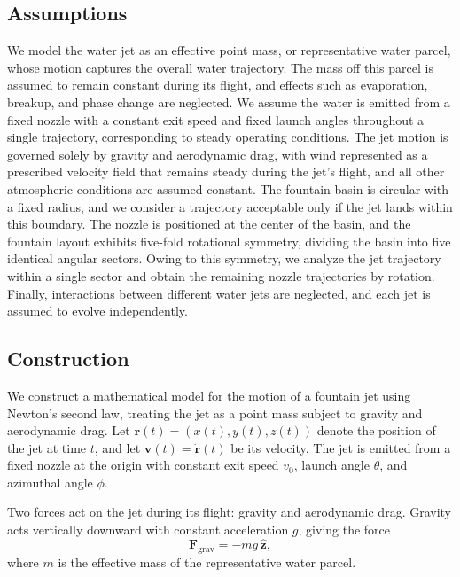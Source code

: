 \documentclass{article}
\begin{document}
\subsection{Assumptions}

We model the water jet as an effective point mass, or representative water parcel, whose motion captures the overall water trajectory. The mass off this parcel is assumed to remain constant during its flight, and effects such as evaporation, breakup, and phase change are neglected. We assume the water is emitted from a fixed nozzle with a constant exit speed and fixed launch angles throughout a single trajectory, corresponding to steady operating conditions. The jet motion is governed solely by gravity and aerodynamic drag, with wind represented as a prescribed velocity field that remains steady during the jet’s flight, and all other atmospheric conditions are assumed constant. The fountain basin is circular with a fixed radius, and we consider a trajectory acceptable only if the jet lands within this boundary. The nozzle is positioned at the center of the basin, and the fountain layout exhibits five-fold rotational symmetry, dividing the basin into five identical angular sectors. Owing to this symmetry, we analyze the jet trajectory within a single sector and obtain the remaining nozzle trajectories by rotation. Finally, interactions between different water jets are neglected, and each jet is assumed to evolve independently.



\subsection{Construction}

We construct a mathematical model for the motion of a fountain jet using Newton’s second law, treating the jet as a point mass subject to gravity and aerodynamic drag. Let
$\mathbf{r}(t) = (x(t), y(t), z(t))$
denote the position of the jet at time \(t\), and let
$\mathbf{v}(t) = \dot{\mathbf{r}}(t)$
be its velocity. The jet is emitted from a fixed nozzle at the origin with constant exit speed \(v_0\), launch angle \(\theta\), and azimuthal angle \(\phi\).

Two forces act on the jet during its flight: gravity and aerodynamic drag. Gravity acts vertically downward with constant acceleration \(g\), giving the force \cite{FitzpatrickProjectileDrag}
\[
\mathbf{F}_{\text{grav}} = - m g \,\hat{\mathbf{z}},
\]
where \(m\) is the effective mass of the representative water parcel.
\end{document}
